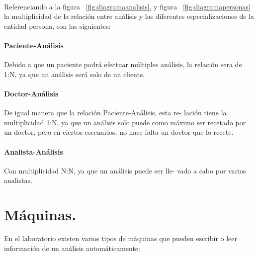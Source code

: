 \documentclass[a4paper,10pt]{article}
\begin{document}
\paragraph{}
Referenciando a la figura ~\ref{fig:diagramaanalisis}, y figura ~\ref{fig:diagramapersonas} la multiplicidad de la relación entre análisis y las diferentes especializaciones de la entidad persona, son las siguientes:
\paragraph{Paciente-Análisis}
Debido a que un paciente podrá efectuar múltiples análisis, la relación sera de 1:N, ya que un análisis será solo de un cliente.
\paragraph{Doctor-Análisis}
De igual manera que la relación Paciente-Análisis, esta re-
lación tiene la multiplicidad 1:N, ya que un análisis solo puede como máximo
ser recetado por un doctor, pero en ciertos escenarios, no hace falta un doctor
que lo recete.

\paragraph{Analista-Análisis}
 Con multiplicidad N:N, ya que un análisis puede ser lle-
vado a cabo por varios analistas.

\pagebreak
\section{Máquinas.}
En el laboratorio existen varios tipos de máquinas que pueden escribir o leer información de un análisis automáticamente:
\end{document}
